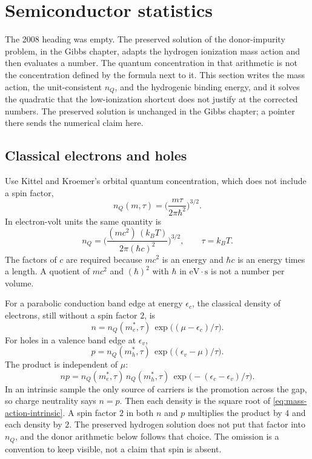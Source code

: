 \section{Semiconductor statistics}
\label{sec:semiconductors}

The 2008 heading was empty. The preserved solution of the donor-impurity problem, in the Gibbs chapter, adapts the hydrogen ionization mass action and then evaluates a number. The quantum concentration in that arithmetic is not the concentration defined by the formula next to it. This section writes the mass action, the unit-consistent \(n_Q\), and the hydrogenic binding energy, and it solves the quadratic that the low-ionization shortcut does not justify at the corrected numbers. The preserved solution is unchanged in the Gibbs chapter; a pointer there sends the numerical claim here.

\subsection{Classical electrons and holes}

Use Kittel and Kroemer's orbital quantum concentration, which does not include a spin factor,
\begin{equation}
\label{eq:nQ-def}
n_Q(m,\tau) = \biggl(\frac{m\tau}{2\pi\hbar^2}\biggr)^{3/2}.
\end{equation}
In electron-volt units the same quantity is
\begin{equation}
\label{eq:nQ-eV}
n_Q
= \Biggl(\frac{(mc^2)\,(k_B T)}{2\pi (\hbar c)^2}\Biggr)^{3/2},
\qquad
\tau = k_B T.
\end{equation}
The factors of \(c\) are required because \(mc^2\) is an energy and \(\hbar c\) is an energy times a length. A quotient of \(mc^2\) and \((\hbar)^2\) with \(\hbar\) in \(\mathrm{eV}\cdot\mathrm{s}\) is not a number per volume.

For a parabolic conduction band edge at energy \(\epsilon_c\), the classical density of electrons, still without a spin factor \(2\), is
\begin{equation}
\label{eq:n-electron}
n = n_Q(m_e^{\!*},\tau)\, \exp\bigl((\mu - \epsilon_c)/\tau\bigr).
\end{equation}
For holes in a valence band edge at \(\epsilon_v\),
\begin{equation}
\label{eq:p-hole}
p = n_Q(m_h^{\!*},\tau)\, \exp\bigl((\epsilon_v - \mu)/\tau\bigr).
\end{equation}
The product is independent of \(\mu\):
\begin{equation}
\label{eq:mass-action-intrinsic}
np = n_Q(m_e^{\!*},\tau)\, n_Q(m_h^{\!*},\tau)\, \exp\bigl(-(\epsilon_c-\epsilon_v)/\tau\bigr).
\end{equation}
In an intrinsic sample the only source of carriers is the promotion across the gap, so charge neutrality says \(n = p\). Then each density is the square root of \eqref{eq:mass-action-intrinsic}. A spin factor \(2\) in both \(n\) and \(p\) multiplies the product by \(4\) and each density by \(2\). The preserved hydrogen solution does not put that factor into \(n_Q\), and the donor arithmetic below follows that choice. The omission is a convention to keep visible, not a claim that spin is absent.

